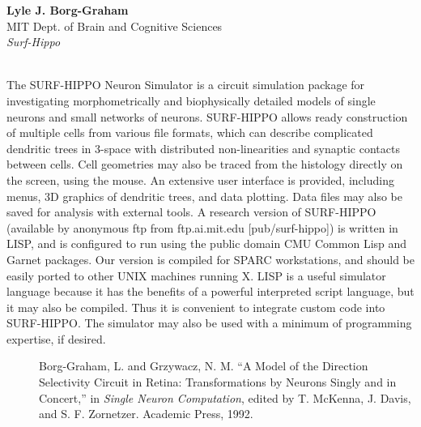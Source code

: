 \begin{center}
\end{center}
\begin{tabular}
{\bf Lyle J. Borg-Graham}\\
MIT Dept. of Brain and Cognitive Sciences\\
{\it Surf-Hippo}\\
\\
\end{tabular}
The SURF-HIPPO Neuron Simulator is a circuit  simulation  package  for
investigating morphometrically and biophysically detailed models of single
neurons and small networks of neurons. SURF-HIPPO allows ready construction of
multiple cells from various file formats, which can describe complicated
dendritic trees in 3-space with distributed non-linearities and synaptic
contacts between cells. Cell geometries may also be traced from the histology
directly on the screen, using the mouse.   An extensive user interface is
provided, including menus, 3D graphics of dendritic trees, and data plotting.
Data files may also be saved for analysis with external tools.  A
research version of SURF-HIPPO
(available by anonymous ftp from ftp.ai.mit.edu [pub/surf-hippo]) is written in
LISP, and is configured to run using the public domain CMU Common Lisp and
Garnet packages. Our version is compiled for SPARC workstations, and should be
easily ported to other UNIX machines running X. LISP is a useful simulator
language because it has the benefits of a powerful interpreted script language,
but it may also be compiled. Thus it is convenient to integrate custom code
into SURF-HIPPO. The simulator may also be used with a minimum of programming
expertise, if desired.
\begin{description}
\item[] Borg-Graham, L. and Grzywacz, N. M. ``A Model of the Direction
Selectivity Circuit in Retina: Transformations by Neurons Singly and
in Concert,'' in {\it Single Neuron Computation}, edited by T.
McKenna, J. Davis, and S. F. Zornetzer. Academic Press, 1992.
\end{description}

\newpage{}


